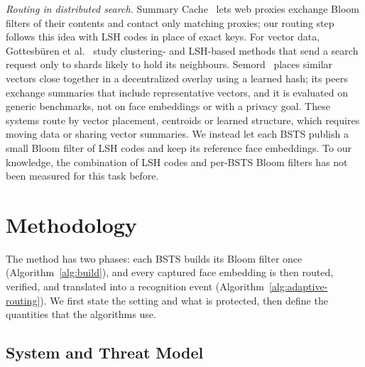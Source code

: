 \documentclass[pdflatex,sn-mathphys-num]{sn-jnl}%
\theoremstyle{thmstyleone}%
\theoremstyle{thmstyletwo}%
\theoremstyle{thmstylethree}%
\begin{document}
\emph{Routing in distributed search.} Summary Cache~\cite{fan2000} lets web proxies exchange Bloom filters of their contents and contact only matching proxies; our routing step follows this idea with LSH codes in place of exact keys. For vector data, Gottesb{\"u}ren et al.~\cite{gottesbueren2024} study clustering- and LSH-based methods that send a search request only to shards likely to hold its neighbours. Semord~\cite{wang2026semord} places similar vectors close together in a decentralized overlay using a learned hash; its peers exchange summaries that include representative vectors, and it is evaluated on generic benchmarks, not on face embeddings or with a privacy goal. These systems route by vector placement, centroids or learned structure, which requires moving data or sharing vector summaries. We instead let each BSTS publish a small Bloom filter of LSH codes and keep its reference face embeddings. To our knowledge, the combination of LSH codes and per-BSTS Bloom filters has not been measured for this task before.

\section{Methodology}
\label{sec:method}

The method has two phases: each BSTS builds its Bloom filter once (Algorithm~\ref{alg:build}), and every captured face embedding is then routed, verified, and translated into a recognition event (Algorithm~\ref{alg:adaptive-routing}). We first state the setting and what is protected, then define the quantities that the algorithms use.

\subsection{System and Threat Model}
\label{sec:model}
\end{document}
